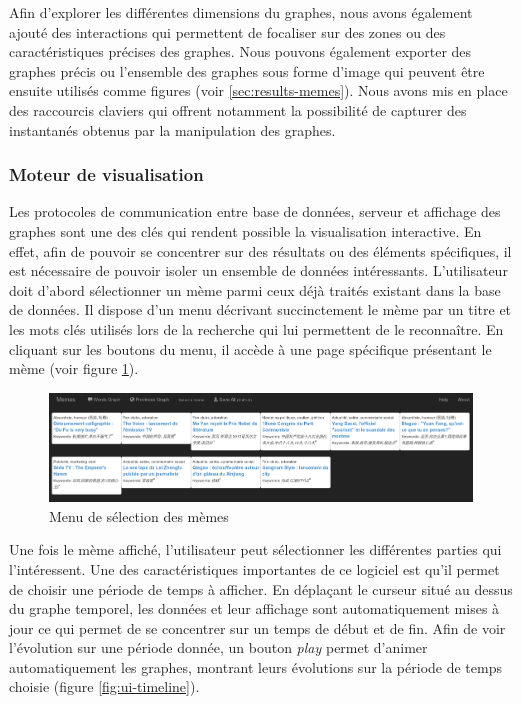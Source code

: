     Afin d{\textquoteright}explorer les différentes dimensions du graphes, nous avons également ajouté des interactions qui permettent de focaliser sur des zones ou des caractéristiques précises des graphes. Nous pouvons également exporter des graphes précis ou l'ensemble des graphes sous forme d'image qui peuvent être ensuite utilisés comme figures (voir \ref{sec:results-memes}). Nous avons mis en place des raccourcis claviers qui offrent notamment la possibilité de capturer des instantanés obtenus par la manipulation des graphes.
    
\subsubsection{Moteur de visualisation} 
\label{sec:moteur_de_visualisation}

    Les protocoles de communication entre base de données, serveur et affichage des graphes sont une des clés qui rendent possible la visualisation interactive. En effet, afin de pouvoir se concentrer sur des résultats ou des éléments spécifiques, il est nécessaire de pouvoir isoler un ensemble de données intéressants. L'utilisateur doit d'abord sélectionner un mème parmi ceux déjà traités existant dans la base de données. Il dispose d'un menu décrivant succinctement le mème par un titre et les mots clés utilisés lors de la recherche qui lui permettent de le reconnaître. En cliquant sur les boutons du menu, il accède à une page spécifique présentant le mème (voir figure \ref{fig:ui-menu}).

    \begin{figure}[h!]
        \centering
        \includegraphics[scale=0.3]{figures/chap4/ui/ui-menu.png}
        \caption{Menu de sélection des mèmes}
        \label{fig:ui-menu}
    \end{figure}


    Une fois le mème affiché, l'utilisateur peut sélectionner les différentes parties qui l'intéressent. Une des caractéristiques importantes de ce logiciel est qu'il permet de choisir une période de temps à afficher. En déplaçant le curseur situé au dessus du graphe temporel, les données et leur affichage sont automatiquement mises à jour ce qui permet de se concentrer sur un temps de début et de fin. Afin de voir l'évolution sur une période donnée, un bouton \textit{play} permet d'animer automatiquement les graphes, montrant leurs évolutions sur la période de temps choisie (figure \ref{fig:ui-timeline}).

